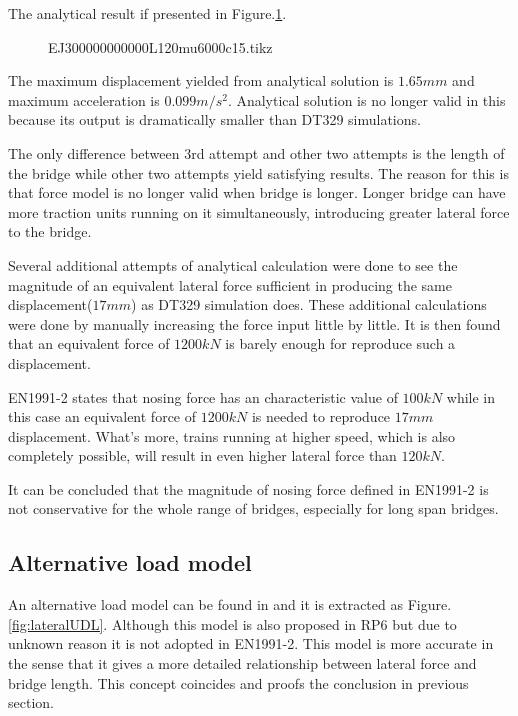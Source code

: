 The analytical result if presented in Figure.\ref{fig:EJ300000000000L120mu6000c15}.

\begin{figure}[h!]
\centering 
\setlength\figureheight{6cm} 
\setlength\figurewidth{6cm} 
 
\caption{EJ300000000000L120mu6000c15.tikz} 
\label{fig:EJ300000000000L120mu6000c15} 
\end{figure}

The maximum displacement yielded from analytical solution is $1.65mm$ and maximum acceleration is $0.099m/s^2$. Analytical solution is no longer valid in this because its output is dramatically smaller than DT329 simulations. 

The only difference between 3rd attempt and other two attempts is the length of the bridge while other two attempts yield satisfying results. The reason for this is that force model is no longer valid when bridge is longer. Longer bridge can have more traction units running on it simultaneously, introducing greater lateral force to the bridge. 

Several additional attempts of analytical calculation were done to see the magnitude of an equivalent lateral force sufficient in producing the same displacement($17mm$) as DT329 simulation does. These additional calculations were done by manually increasing the force input little by little. It is then found that an equivalent force of $1200kN$ is barely enough for reproduce such a displacement.

EN1991-2 states that nosing force has an characteristic value of $100kN$ while in this case an equivalent force of $1200kN$ is needed to reproduce $17mm$ displacement. What's more, trains running at higher speed, which is also completely possible, will result in even higher lateral force than $120kN$.

It can be concluded that the magnitude of nosing force defined in EN1991-2 is not conservative for the whole range of bridges, especially for long span bridges. 

\subsection{Alternative load model}

An alternative load model can be found in \cite[Figure.4.1]{d181} and it is extracted as Figure.\ref{fig:lateralUDL}. Although this model is also proposed in RP6 but due to unknown reason it is not adopted in EN1991-2. This model is more accurate in the sense that it gives a more detailed relationship between lateral force and bridge length. This concept coincides and proofs the conclusion in previous section.

